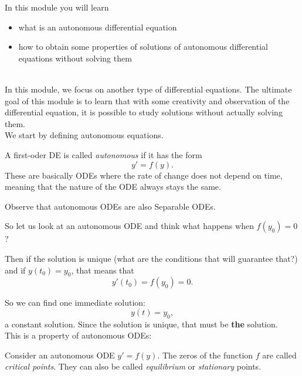 In this module you will learn
\begin{itemize}
	\item what is an autonomous differential equation
	\item how to obtain some properties of solutions of autonomous differential equations without solving them
\end{itemize}

\hfill \\




In this module, we focus on another type of differential equations.
The ultimate goal of this module is to learn that with some creativity and observation of the differential equation, it is possible to study solutions without actually solving them. \\


We start by defining autonomous equations.



\begin{definition}
A first-oder DE is called \emph{autonomous} if it has the form
$$
y' = f(y).
$$
These are basically ODEs where the rate of change does not depend on time, meaning that the nature of the ODE always stays the same.

\end{definition}


\begin{graybox}
Observe that autonomous ODEs are also Separable ODEs.	
\end{graybox}


So let us look at an autonomous ODE and think what happens when $f(y_0)=0$?

Then if the solution is unique (what are the conditions that will guarantee that?) and if $y(t_0)=y_0$, that means that
$$
y'(t_0) = f(y_0)=0.
$$

So we can find one immediate solution:
$$
y(t) = y_0,
$$
a constant solution. Since the solution is unique, that must be \textbf{the} solution. \\


This is a property of autonomous ODEs:

\begin{definition}
Consider an autonomous ODE $y'=f(y)$.
The zeros of the function $f$ are called \emph{critical points}. They can also be called \emph{equilibrium} or \emph{stationary} points.
\end{definition}


